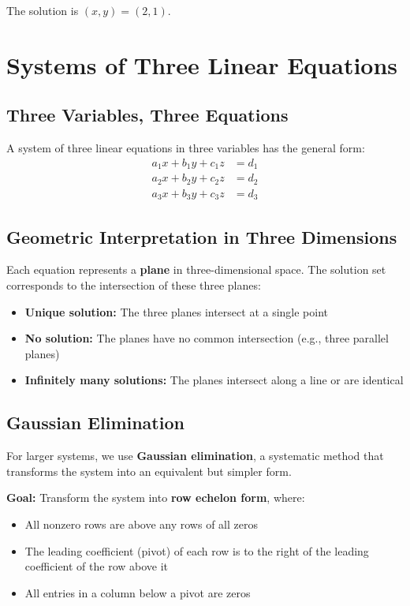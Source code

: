 \documentclass[12pt]{article}
\begin{document}
The solution is $(x, y) = (2, 1)$.

\section{Systems of Three Linear Equations}

\subsection{Three Variables, Three Equations}

A system of three linear equations in three variables has the general form:
\begin{align}
a_1x + b_1y + c_1z &= d_1 \\
a_2x + b_2y + c_2z &= d_2 \\
a_3x + b_3y + c_3z &= d_3
\end{align}

\subsection{Geometric Interpretation in Three Dimensions}

Each equation represents a \textbf{plane} in three-dimensional space. The solution set corresponds to the intersection of these three planes:

\begin{itemize}
\item \textbf{Unique solution:} The three planes intersect at a single point
\item \textbf{No solution:} The planes have no common intersection (e.g., three parallel planes)
\item \textbf{Infinitely many solutions:} The planes intersect along a line or are identical
\end{itemize}

\subsection{Gaussian Elimination}

For larger systems, we use \textbf{Gaussian elimination}, a systematic method that transforms the system into an equivalent but simpler form.

\textbf{Goal:} Transform the system into \textbf{row echelon form}, where:
\begin{itemize}
\item All nonzero rows are above any rows of all zeros
\item The leading coefficient (pivot) of each row is to the right of the leading coefficient of the row above it
\item All entries in a column below a pivot are zeros
\end{itemize}
\end{document}
